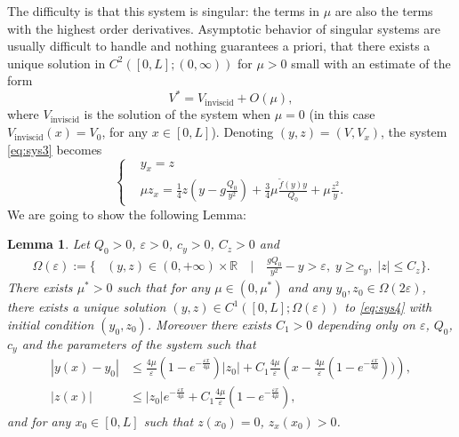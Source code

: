 \documentclass[11pt]{article}
\newtheorem{lem}{Lemma}[section]
\begin{document}
The difficulty is that this system is singular: the terms in $\mu$ are also the terms with the highest order derivatives. Asymptotic behavior of singular systems are usually difficult to handle 
and nothing guarantees a priori, that there exists a unique solution in $C^{2}([0,L];(0,\infty))$ for $\mu>0$ small with an estimate of the form
\begin{equation}
V^{*} = V_{\text{inviscid}} + O(\mu),
\end{equation}
where $V_{\text{inviscid}}$ is the solution of the system when $\mu=0$ (in this case $V_{\text{inviscid}}(x) = V_{0}$, for any $x\in[0,L]$). Denoting $(y,z)  = (V,V_{x})$, the system \eqref{eq:sys3} becomes
\begin{equation}
\label{eq:sys4}
    \begin{cases}
        &y_{x} = z\\
        & \mu z_{x} = \frac{1}{4}z\left(y-g \frac{Q_{0}}{y^{2}}\right)+\frac{3}{4}\mu \frac{\tilde{f}(y)y}{Q_{0}}+\mu \frac{z^{2}}{y}.
    \end{cases}
\end{equation}
We are going to show the following Lemma:
\begin{lem}
\label{lem:appendix}
Let $Q_{0}>0$, $\varepsilon>0$, $c_{y}>0$, $C_{z}>0$ and
\begin{equation}
\begin{split}
\Omega(\varepsilon) := \Big\{&(y,z)\in (0,+\infty)\times\mathbb{R} \quad \Big| \quad \frac{gQ_{0}}{y^{2}}-y>\varepsilon,\; y\geq c_{y},\; |z|\leq C_{z} \Big\}.
\end{split}
\end{equation}
There exists $\mu^{*}>0$ such that for any $\mu\in(0,\mu^{*})$ and any $y_{0},z_{0}\in \Omega(2\varepsilon)$, there exists a unique solution $(y,z)\in C^{1}([0,L];\Omega(\varepsilon))$ to \eqref{eq:sys4} with initial condition $(y_{0},z_{0})$. Moreover there exists $C_{1}>0$ depending only on $\varepsilon$, $Q_{0}$, $c_{y}$ and the parameters of the system such that 
\begin{equation}
\label{eq:estimyz}
\begin{split}
|y(x)-y_{0}|&\leq \frac{4\mu}{\varepsilon}\left(1-e^{-\frac{\varepsilon x}{4\mu}}\right)|z_{0}| + C_{1}\frac{4\mu}{\varepsilon}\left(x-\frac{4\mu}{\varepsilon}(1-e^{-\frac{\varepsilon x}{4\mu}}))\right),\\
|z(x)|&\leq  |z_{0}| e^{-\frac{\varepsilon x}{4\mu}}+ C_{1}\frac{4\mu}{\varepsilon}(1-e^{-\frac{\varepsilon x}{4\mu}}),
\end{split}
\end{equation}
{and for any $x_{0}\in[0,L]$ such that $z(x_{0})=0$, $z_{x}(x_{0})>0$.}
\end{lem}
\end{document}
